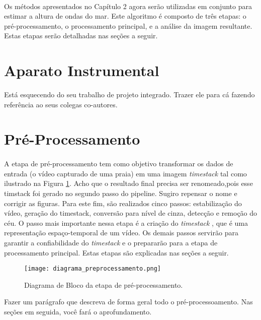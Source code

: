 \newcommand{\timestack}[0]{\textit{timestack} }

\paragraph{}Os métodos apresentados no Capítulo 2 agora serão utilizadas em conjunto para estimar a altura de ondas do mar. Este algoritmo é composto de três etapas: o pré-processamento, o processamento principal, e a análise da imagem resultante. Estas etapas serão detalhadas nas seções a seguir.
\section{Aparato Instrumental}
Está esquecendo do seu trabalho de projeto integrado. Trazer ele para cá fazendo referência ao seus colegas co-autores.
\section{Pré-Processamento}

\paragraph{}A etapa de pré-processamento tem como objetivo transformar os dados de entrada (o vídeo capturado de uma praia) em uma imagem \timestack tal como ilustrado na Figura \ref{FigDiagramaPreProc}. Acho que o resultado final precisa ser renomeado,pois esse timstack foi gerado no segundo passo do pipeline. Sugiro repensar o nome e corrigir as figuras. Para este fim, são realizados cinco passos: estabilização do vídeo, geração do timestack, conversão para nível de cinza, detecção e remoção do céu. O passo mais importante nessa etapa é a criação do \timestack, que é uma representação espaço-temporal de um vídeo. Os demais passos servirão para garantir a confiabilidade do \timestack e o prepararão para a etapa de processamento principal.  Estas etapas são explicadas nas seções a seguir.
\begin{figure}[h]
\begin{center}
  \texttt{[image: diagrama\_preprocessamento.png]}
  \caption[\small{Diagrama de Bloco da etapa de pré-processamento.}]{\label{FigDiagramaPreProc} \small{Diagrama de Bloco da etapa de pré-processamento.}}
\end{center}
\end{figure}
Fazer um parágrafo que descreva de forma geral todo o pré-processoamento. Nas seções em seguida, você fará o aprofundamento.
